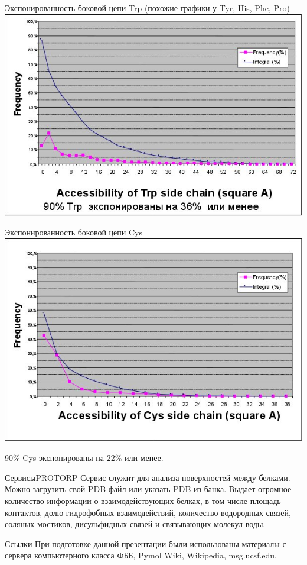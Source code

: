 \documentclass{beamer}
\begin{document}
    \begin{frame}{Экспонированность боковой цепи Trp}
        {(похожие графики у Tyr, His, Phe, Pro)}
        \includegraphics[height=0.8\textheight]{exp-trp.jpg}
    \end{frame}

    \begin{frame}{Экспонированность боковой цепи Cys}
        \includegraphics[height=0.8\textheight]{exp-cys.jpg}

        90\% Cys экспонированы на 22\% или менее.
    \end{frame}

    \begin{frame}{Сервисы}{PROTORP}
    Сервис служит для анализа поверхностей между белками.
    Можно загрузить свой PDB-файл или указать PDB из банка.
    Выдает огромное количество информации о взаимодействующих белках,
    в том числе площадь контактов, долю гидрофобных взаимодействий,
    количество водородных связей, соляных мостиков, дисульфидных связей
    и связывающих молекул воды.
    \end{frame}

    \begin{frame}{Ссылки}
        При подготовке данной презентации были использованы материалы с
        сервера компьютерного класса ФББ, Pymol Wiki, Wikipedia, msg.ucsf.edu.
    \end{frame}
\end{document}
